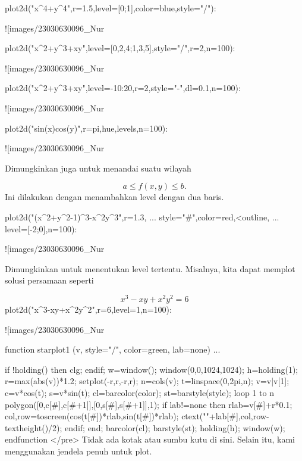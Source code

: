 \documentclass{article}
\begin{document}
\>plot2d("x^4+y^4",r=1.5,level=[0;1],color=blue,style="/"):


![images/23030630096_Nur%

\>plot2d("x^2+y^3+x\*y",level=[0,2,4;1,3,5],style="/",r=2,n=100):


![images/23030630096_Nur%

\>plot2d("x^2+y^3+x\*y",level=-10:20,r=2,style="-",dl=0.1,n=100):


![images/23030630096_Nur%

\>plot2d("sin(x)\*cos(y)",r=pi,\>hue,\>levels,n=100):


![images/23030630096_Nur%

Dimungkinkan juga untuk menandai suatu wilayah


$$a \le f(x,y) \le b.$$Ini dilakukan dengan menambahkan level dengan dua baris.


\>plot2d("(x^2+y^2-1)^3-x^2\*y^3",r=1.3, ...  
\>     style="#",color=red,<outline, ...  
\>     level=[-2;0],n=100):


![images/23030630096_Nur%

Dimungkinkan untuk menentukan level tertentu. Misalnya, kita dapat
memplot solusi persamaan seperti


$$x^3-xy+x^2y^2=6$$\>plot2d("x^3-x\*y+x^2\*y^2",r=6,level=1,n=100):


![images/23030630096_Nur%

\>function starplot1 (v, style="/", color=green, lab=none) ...


      if !holding() then clg; endif;
      w=window(); window(0,0,1024,1024);
      h=holding(1);
      r=max(abs(v))*1.2;
      setplot(-r,r,-r,r);
      n=cols(v); t=linspace(0,2pi,n);
      v=v|v[1]; c=v*cos(t); s=v*sin(t);
      cl=barcolor(color); st=barstyle(style);
      loop 1 to n
        polygon([0,c[#],c[#+1]],[0,s[#],s[#+1]],1);
        if lab!=none then
          rlab=v[#]+r*0.1;
          {col,row}=toscreen(cos(t[#])*rlab,sin(t[#])*rlab);
          ctext(""+lab[#],col,row-textheight()/2);
        endif;
      end;
      barcolor(cl); barstyle(st);
      holding(h);
      window(w);
    endfunction
</pre>
Tidak ada kotak atau sumbu kutu di sini. Selain itu, kami menggunakan
jendela penuh untuk plot.
\end{document}
